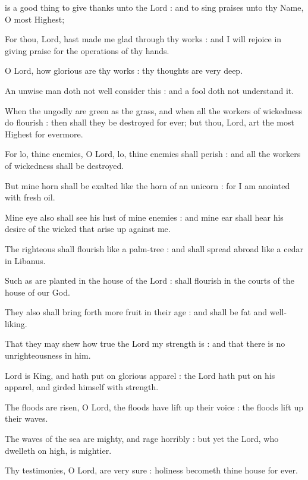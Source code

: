  is a good thing to give thanks unto the Lord : and to sing praises unto thy Name, O most Highest;\par
{}
For thou, Lord, hast made me glad through thy works : and I will rejoice in giving praise for the operations of thy hands.\par
{}O Lord, how glorious are thy works : thy thoughts are very deep.\par
{}An unwise man doth not well consider this : and a fool doth not understand it.\par
{}When the ungodly are green as the grass, and when all the workers of wickedness do flourish : then shall they be destroyed for ever; but thou, Lord, art the most Highest for evermore.\par
{}For lo, thine enemies, O Lord, lo, thine enemies shall perish : and all the workers of wickedness shall be destroyed.\par
{}But mine horn shall be exalted like the horn of an unicorn : for I am anointed with fresh oil.\par
{}Mine eye also shall see his lust of mine enemies : and mine ear shall hear his desire of the wicked that arise up against me.\par
{}The righteous shall flourish like a palm-tree : and shall spread abroad like a cedar in Libanus.\par
{}Such as are planted in the house of the Lord : shall flourish in the courts of the house of our God.\par
{}They also shall bring forth more fruit in their age : and shall be fat and well-liking.\par
{}That they may shew how true the Lord my strength is : and that there is no unrighteousness in him.\par



 Lord is King, and hath put on glorious apparel : the Lord hath put on his apparel, and girded himself with strength.\par
{}
The floods are risen, O Lord, the floods have lift up their voice : the floods lift up their waves.\par
{}The waves of the sea are mighty, and rage horribly : but yet the Lord, who dwelleth on high, is mightier.\par
{}Thy testimonies, O Lord, are very sure : holiness becometh thine house for ever.\par

